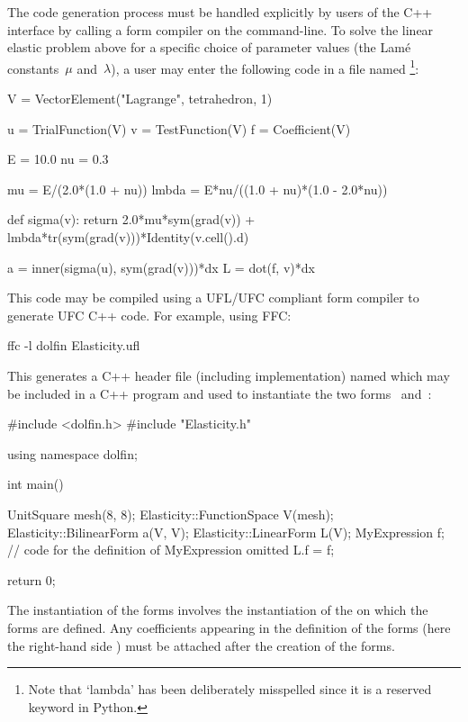 The code generation process must be handled explicitly by users of the C++
interface by calling a form compiler on the command-line. To solve the
linear elastic problem above for a specific choice of parameter values
(the Lam\'e constants~$\mu$ and~$\lambda$), a user may enter the following
code in a file named \footnote{Note that `lambda'
has been deliberately misspelled since it is a reserved keyword
in Python.}:
\begin{uflcode}
V = VectorElement("Lagrange", tetrahedron, 1)

u = TrialFunction(V)
v = TestFunction(V)
f = Coefficient(V)

E  = 10.0
nu = 0.3

mu    = E/(2.0*(1.0 + nu))
lmbda = E*nu/((1.0 + nu)*(1.0 - 2.0*nu))

def sigma(v):
    return 2.0*mu*sym(grad(v)) + lmbda*tr(sym(grad(v)))*Identity(v.cell().d)

a = inner(sigma(u), sym(grad(v)))*dx
L = dot(f, v)*dx
\end{uflcode}
This code may be compiled using a UFL/UFC compliant form compiler to
generate UFC C++ code. For example, using FFC:
\begin{bash}
ffc -l dolfin Elasticity.ufl
\end{bash}
This generates a C++ header file (including implementation) named
 which may be included in a C++ program and used to
instantiate the two forms~ and~:
\begin{c++}
#include <dolfin.h>
#include "Elasticity.h"

using namespace dolfin;

int main()
{
  UnitSquare mesh(8, 8);
  Elasticity::FunctionSpace V(mesh);
  Elasticity::BilinearForm a(V, V);
  Elasticity::LinearForm L(V);
  MyExpression f; // code for the definition of MyExpression omitted
  L.f = f;

  return 0;
}
\end{c++}
The instantiation of the forms involves the instantiation of the
 on which the forms are defined. Any coefficients
appearing in the definition of the forms (here the right-hand side
) must be attached after the creation of the forms.

